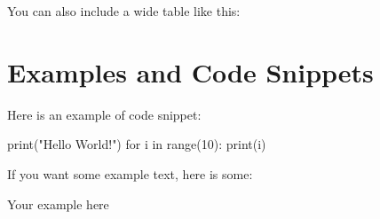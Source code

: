 You can also include a wide table like this:




\section{Examples and Code Snippets}

Here is an example of code snippet:
\begin{code}
	print("Hello World!")
	for i in range(10):
		print(i)
\end{code}

If you want some example text, here is some:
\begin{example}
	Your example here
\end{example}